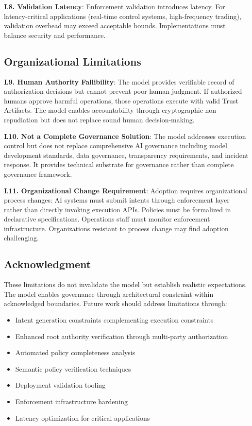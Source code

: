 \documentclass[11pt,letterpaper]{article}
\begin{document}
\textbf{L8. Validation Latency}: Enforcement validation introduces latency. For latency-critical applications (real-time control systems, high-frequency trading), validation overhead may exceed acceptable bounds. Implementations must balance security and performance.

\subsection{Organizational Limitations}

\textbf{L9. Human Authority Fallibility}: The model provides verifiable record of authorization decisions but cannot prevent poor human judgment. If authorized humans approve harmful operations, those operations execute with valid Trust Artifacts. The model enables accountability through cryptographic non-repudiation but does not replace sound human decision-making.

\textbf{L10. Not a Complete Governance Solution}: The model addresses execution control but does not replace comprehensive AI governance including model development standards, data governance, transparency requirements, and incident response. It provides technical substrate for governance rather than complete governance framework.

\textbf{L11. Organizational Change Requirement}: Adoption requires organizational process changes: AI systems must submit intents through enforcement layer rather than directly invoking execution APIs. Policies must be formalized in declarative specifications. Operations staff must monitor enforcement infrastructure. Organizations resistant to process change may find adoption challenging.

\subsection{Acknowledgment}

These limitations do not invalidate the model but establish realistic expectations. The model enables governance through architectural constraint within acknowledged boundaries. Future work should address limitations through:

\begin{itemize}
\item Intent generation constraints complementing execution constraints
\item Enhanced root authority verification through multi-party authorization
\item Automated policy completeness analysis
\item Semantic policy verification techniques
\item Deployment validation tooling
\item Enforcement infrastructure hardening
\item Latency optimization for critical applications
\end{itemize}
\end{document}
